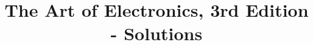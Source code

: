 \documentclass{article}
\begin{document}
	\title{The Art of Electronics, 3rd Edition - Solutions}

	

	\tableofcontents
	\newpage

	
	
\end{document}
